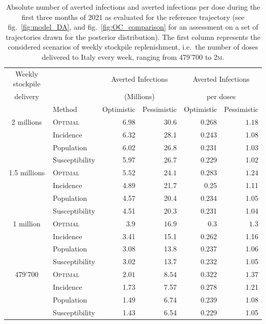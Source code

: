 \begin{table}[h!]
\centering
\begin{tabular}{clrrrr}
\toprule
Weekly stockpile& {} & \multicolumn{2}{c}{Averted Infections} & \multicolumn{2}{c}{Averted Infections} \\
delivery&  {}  &\multicolumn{2}{c}{(Millions)} & \multicolumn{2}{c}{ per doses} \\
& Method &  Optimistic & Pessimistic &     Optimistic & Pessimistic \\
\midrule
2 millions & \textsc{Optimal} &   $6.98$ &  $30.6$ & $0.268$ & $1.18$ \\
        & Incidence &   6.32 &    28.1 &          0.243 &        1.08 \\
        & Population &   6.02 &    26.8 &          0.231 &        1.03 \\
        & Susceptibility &   5.97 &    26.7 &          0.229 &        1.02 \\
1.5 millions & \textsc{Optimal} &   $5.52$ &   $24.1$ &  $ 0.283$ & $1.24$ \\
        & Incidence &   4.89 &    21.7 &           0.25 &        1.11 \\
        & Population &   4.57 &    20.4 &          0.234 &        1.05 \\
        & Susceptibility &   4.51 &    20.3 &          0.231 &        1.04 \\
1 million & \textsc{Optimal} &    $3.9$ &    $16.9$ &  $0.3$ & $1.3$ \\
        & Incidence &   3.41 &    15.1 &          0.262 &        1.16 \\
        & Population &   3.08 &    13.8 &          0.237 &        1.06 \\
        & Susceptibility &   3.02 &    13.7 &          0.232 &        1.05 \\
479'700 & \textsc{Optimal} &  $2.01$ &  $8.54$ & $0.322$ & $1.37$ \\
        & Incidence &   1.73 &    7.57 &          0.278 &        1.21 \\
        & Population &   1.49 &    6.74 &          0.239 &        1.08 \\
        & Susceptibility &   1.43 &    6.54 &          0.229 &        1.05 \\
\bottomrule
\end{tabular}

\caption[Averted infections per dose for different allocation strategies]{Absolute number of averted infections and averted infections per dose during the first three months of 2021 as evaluated for the reference trajectory (see fig.~\ref{fig:model_DA}, and fig.~\ref{fig:OC_comparison} for an assessment on a set of trajectories drawn for the posterior distribution). The first column represents the considered scenarios of weekly stockpile replenishment, i.e.~the number of doses delivered to Italy every week, ranging from 479'700 to 2\textsc{m}.}
\label{table:averted_abs}
\end{table}
